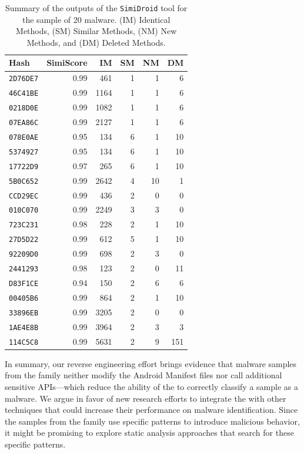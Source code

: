  
\begin{table}[ht]
  \centering
  \caption{Summary of the outputs of the \texttt{SimiDroid} tool for the sample of 20
    \gps malware. (IM) Identical Methods, (SM) Similar Methods, (NM) New Methods, and
    (DM) Deleted Methods.}
  \begin{tabular}{lrrrrr}
   \toprule
    Hash & SimiScore & IM & SM & NM & DM \\ 
   \midrule
   \texttt{2D76DE7} & 0.99 & 461 &    1 &   1 &   6 \\ 
   \texttt{46C41BE} & 0.99 & 1164 &   1 &   1 &   6 \\ 
   \texttt{0218D0E} & 0.99 & 1082 &   1 &   1 &   6 \\ 
   \texttt{07EA86C} & 0.99 & 2127 &   1 &   1 &   6 \\ 
   \texttt{078E0AE} & 0.95 & 134 &   6 &   1 &  10 \\ 
   \texttt{5374927} & 0.95 & 134 &   6 &   1 &  10 \\ 
   \texttt{17722D9} & 0.97 & 265 &   6 &   1 &  10 \\ 
   \texttt{5B0C652} & 0.99 & 2642 &   4 &  10 &   1 \\ 
   \texttt{CCD29EC} & 0.99 & 436 &   2 &   0 &   0 \\ 
   \texttt{010C070} & 0.99 & 2249 &   3 &   3 &   0 \\ 
   \texttt{723C231} & 0.98 & 228 &   2 &   1 &  10 \\ 
   \texttt{27D5D22} & 0.99 & 612 &   5 &   1 &  10 \\ 
   \texttt{92209D0} & 0.99 & 698 &   2 &   3 &   0 \\ 
   \texttt{2441293} & 0.98 & 123 &   2 &   0 &  11 \\ 
   \texttt{D83F1CE} & 0.94 & 150 &   2 &   6 &   6 \\ 
   \texttt{00405B6} & 0.99 & 864 &   2 &   1 &  10 \\ 
   \texttt{33896EB} & 0.99 & 3205 &   2 &   0 &   0 \\ 
   \texttt{1AE4E8B} & 0.99 & 3964 &   2 &   3 &   3 \\
   \texttt{114C5C8} & 0.99 & 5631 &   2 &   9 & 151 \\ 
   \bottomrule
 \end{tabular}
 \label{tab:simidroid-outputs}
\end{table}

In summary, our reverse engineering effort brings evidence that malware
samples from the \gps family neither modify the Android Manifest
files nor call additional sensitive APIs---which reduce the ability
of the \mas to correctly classify a sample as a malware. We argue in favor
of new research efforts to integrate the \mas 
with other techniques that could increase their performance
on malware identification. Since the samples from the \gps
family use specific patterns to introduce malicious behavior,
it might be promising to explore static analysis approaches that
search for these specific patterns. 



